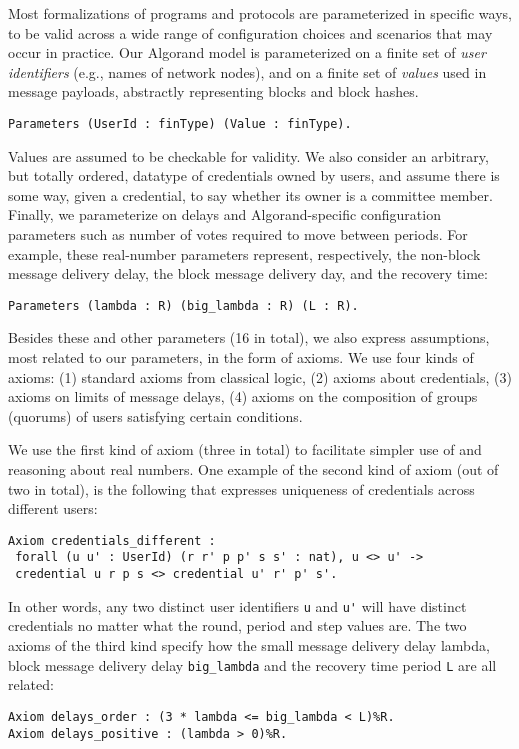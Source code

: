 Most formalizations of programs and protocols are parameterized in specific ways, to be valid across a wide range of configuration choices and scenarios that may occur in practice. Our Algorand model is parameterized on a finite set of \emph{user identifiers} (e.g., names of network nodes), and on a finite set of \emph{values} used in message payloads, abstractly representing blocks and block hashes.

\begin{lstlisting}[language=Coq]
Parameters (UserId : finType) (Value : finType).
\end{lstlisting}

Values are assumed to be checkable for validity. We also consider an arbitrary, but totally ordered, datatype of credentials owned by users, and assume there is some way, given a credential, to say whether its owner is a committee member. Finally, we parameterize on delays and Algorand-specific configuration parameters such as number of votes required to move between periods. For example, these real-number parameters represent, respectively, the non-block message delivery delay, the block message delivery day, and the recovery time:
\begin{lstlisting}[language=Coq]
Parameters (lambda : R) (big_lambda : R) (L : R).
\end{lstlisting}

Besides these and other parameters (16 in total), we also express assumptions, most related to our parameters, in the form of axioms. We use four kinds of axioms:
(1) standard axioms from classical logic, (2) axioms about credentials, (3) axioms on limits of message delays, (4) axioms on the composition of groups (quorums) of users satisfying certain conditions.

We use the first kind of axiom (three in total) to facilitate simpler use of and reasoning about real numbers.
One example of the second kind of axiom (out of two in total), is the following that expresses uniqueness of credentials
across different users:
\begin{lstlisting}[language=Coq]
Axiom credentials_different :
 forall (u u' : UserId) (r r' p p' s s' : nat), u <> u' ->
 credential u r p s <> credential u' r' p' s'.
\end{lstlisting}
In other words, any two distinct user identifiers \lstinline{u} and \lstinline{u'} will have distinct credentials no matter what the round, period and step values are.
The two axioms of the third kind specify how the small message delivery delay lambda, block message delivery delay \lstinline{big_lambda} and the recovery time period \lstinline{L} are all related:
\begin{lstlisting}[language=Coq]
Axiom delays_order : (3 * lambda <= big_lambda < L)%R.
Axiom delays_positive : (lambda > 0)%R.
\end{lstlisting}

